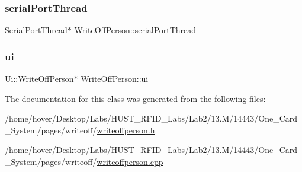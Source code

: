\subsubsection{\texorpdfstring{serialPortThread}{serialPortThread}}
{\footnotesize\ttfamily \mbox{\hyperlink{class_serial_port_thread}{Serial\+Port\+Thread}}$\ast$ Write\+Off\+Person\+::serial\+Port\+Thread\hspace{0.3cm}{\ttfamily [private]}}

\mbox{\label{class_write_off_person_aaf19403b2f951f81bbd58c246247b64d}} 
\subsubsection{\texorpdfstring{ui}{ui}}
{\footnotesize\ttfamily Ui\+::\+Write\+Off\+Person$\ast$ Write\+Off\+Person\+::ui\hspace{0.3cm}{\ttfamily [private]}}



The documentation for this class was generated from the following files\+:\begin{DoxyCompactItemize}
\item 
/home/hover/\+Desktop/\+Labs/\+H\+U\+S\+T\+\_\+\+R\+F\+I\+D\+\_\+\+Labs/\+Lab2/13.\+M/14443/\+One\+\_\+\+Card\+\_\+\+System/pages/writeoff/\mbox{\hyperlink{writeoffperson_8h}{writeoffperson.\+h}}\item 
/home/hover/\+Desktop/\+Labs/\+H\+U\+S\+T\+\_\+\+R\+F\+I\+D\+\_\+\+Labs/\+Lab2/13.\+M/14443/\+One\+\_\+\+Card\+\_\+\+System/pages/writeoff/\mbox{\hyperlink{writeoffperson_8cpp}{writeoffperson.\+cpp}}\end{DoxyCompactItemize}
